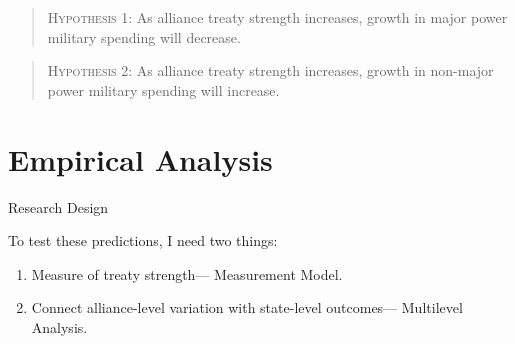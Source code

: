 \documentclass{beamer}
\begin{document}





\begin{frame}[standout]


\begin{quote}
\textsc{Hypothesis 1}: As alliance treaty strength increases, growth in major power military spending will decrease. 
\end{quote} 
\pause 
\begin{quote}
\textsc{Hypothesis 2}: As alliance treaty strength increases, growth in non-major power military spending will increase. 
\end{quote} 


\end{frame}




\section{Empirical Analysis} 


\begin{frame}{Research Design}

To test these predictions, I need two things: 

\pause 
\begin{enumerate} 
\item Measure of treaty strength--- Measurement Model. 
\pause
\item Connect alliance-level variation with state-level outcomes--- Multilevel Analysis.  
\end{enumerate} 


\end{frame}
\end{document}
